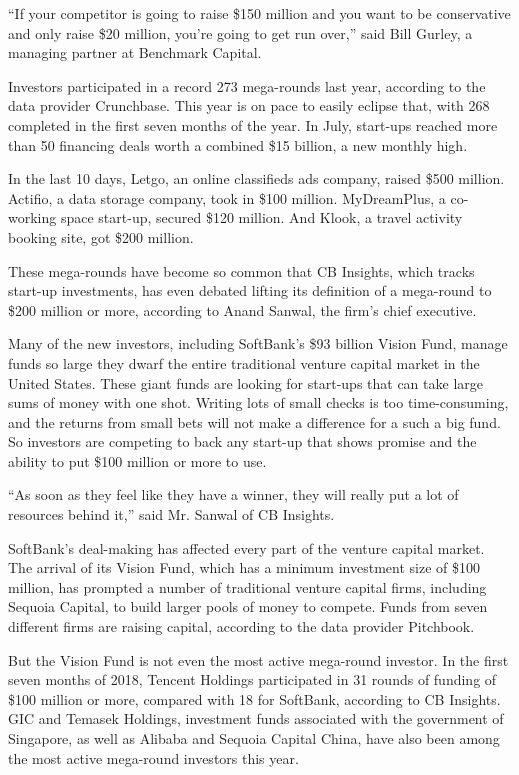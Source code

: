 ``If your competitor is going to raise \$150 million and you want to be
conservative and only raise \$20 million, you're going to get run
over,'' said Bill Gurley, a managing partner at Benchmark Capital.

Investors participated in a record 273 mega-rounds last year, according
to the data provider Crunchbase. This year is on pace to easily eclipse
that, with 268 completed in the first seven months of the year. In July,
start-ups reached more than 50 financing deals worth a combined \$15
billion, a new monthly high.

In the last 10 days, Letgo, an online classifieds ads company, raised
\$500 million. Actifio, a data storage company, took in \$100 million.
MyDreamPlus, a co-working space start-up, secured \$120 million. And
Klook, a travel activity booking site, got \$200 million.

These mega-rounds have become so common that CB Insights, which tracks
start-up investments, has even debated lifting its definition of a
mega-round to \$200 million or more, according to Anand Sanwal, the
firm's chief executive.

Many of the new investors, including SoftBank's \$93 billion Vision
Fund, manage funds so large they dwarf the entire traditional venture
capital market in the United States. These giant funds are looking for
start-ups that can take large sums of money with one shot. Writing lots
of small checks is too time-consuming, and the returns from small bets
will not make a difference for a such a big fund. So investors are
competing to back any start-up that shows promise and the ability to put
\$100 million or more to use.

``As soon as they feel like they have a winner, they will really put a
lot of resources behind it,'' said Mr. Sanwal of CB Insights.

SoftBank's deal-making has affected every part of the venture capital
market. The arrival of its Vision Fund, which has a minimum investment
size of \$100 million, has prompted a number of traditional venture
capital firms, including Sequoia Capital, to build larger pools of money
to compete. Funds from seven different firms are raising capital,
according to the data provider Pitchbook.

But the Vision Fund is not even the most active mega-round investor. In
the first seven months of 2018, Tencent Holdings participated in 31
rounds of funding of \$100 million or more, compared with 18 for
SoftBank, according to CB Insights. GIC and Temasek Holdings, investment
funds associated with the government of Singapore, as well as Alibaba
and Sequoia Capital China, have also been among the most active
mega-round investors this year.

